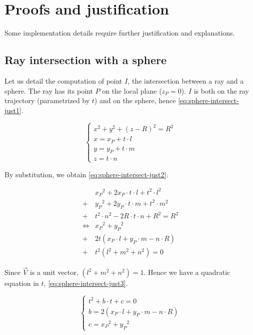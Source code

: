 \section{Proofs and justification}
\label{sec:justification}

Some implementation details require further justification and explanations.

\subsection{Ray intersection with a sphere}
Let us detail the computation of point $I$, the intersection between
a ray and a sphere. The ray has its point $P$ on the local plane
($z_P = 0$).
$I$ is both on the ray trajectory (parametrized by $t$) and on the sphere,
hence \cref{eq:sphere-intersect-just1}.

\begin{equation} \label{eq:sphere-intersect-just1}
\begin{cases}
x^2 + y^2 + (z - R)^2 = R^2 \\
x = x_P + t \cdot l \\
y = y_P + t \cdot m \\
z = t \cdot n
\end{cases}
\end{equation}

By substitution, we obtain \cref{eq:sphere-intersect-just2}.

\begin{equation} \label{eq:sphere-intersect-just2}
\begin{split}
&{x_P}^2 + 2 x_P \cdot t \cdot l + t^2
\cdot l^2 \\
+ &{y_P}^2 + 2 y_P \cdot t \cdot m + t^2
\cdot m^2 \\
+ &t^2 \cdot n^2 - 2 R \cdot t \cdot n + R^2
= R^2 \\
\iff &{x_P}^2 + {y_P}^2 \\
+ & 2 t (x_P \cdot l + y_P \cdot m - n \cdot R) \\
+ & t^2 (l^2 + m^2 + n^2) = 0
\end{split} \end{equation}

Since $\overrightarrow{V}$ is a unit vector, $(l^2 + m^2 + n^2) = 1$.
Hence we have a quadratic equation in $t$, \cref{eq:sphere-intersect-just3}.

\begin{equation} \label{eq:sphere-intersect-just3} \begin{cases}
t^2 + b \cdot t + c = 0 \\
b = 2 (x_P \cdot l + y_P \cdot m - n \cdot R) \\
c = {x_P}^2 + {y_P}^2
\end{cases} \end{equation}

